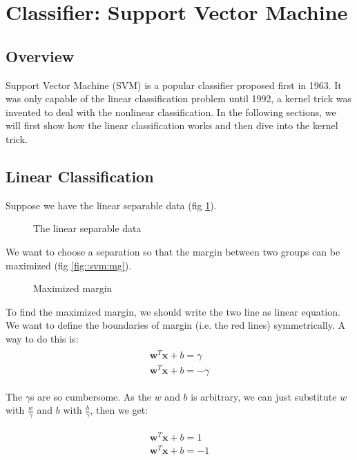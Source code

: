 \section{Classifier: Support Vector Machine}
\subsection{Overview} 
Support Vector Machine (SVM) is a popular classifier proposed first in 1963. 
It was only capable of the linear classification problem until 1992, a kernel trick was invented to deal with the nonlinear classification. 
In the following sections, we will first show how the linear classification works and then dive into the kernel trick.

\subsection{Linear Classification}
Suppose we have the linear separable data (fig \ref{fig:svm:lsd}). 
\begin{figure}[H]
\centering

\caption{The linear separable data}
\label{fig:svm:lsd}
\end{figure}

We want to choose a separation so that the margin between two groups can be maximized (fig \ref{fig::svm:mg}). 

\begin{figure}[H]
\centering

\caption{Maximized margin}
\label{fig:svm:mg}
\end{figure}

To find the maximized margin, we should write the two line as linear equation. 
We want to define the boundaries of margin (i.e. the red lines) symmetrically. A way to do this is:
\begin{align}
\begin{split}
\mathbf{w}^T \mathbf{x} + b = \gamma \\
\mathbf{w}^T \mathbf{x} + b = -\gamma
\end{split}
\end{align}

The $\gamma$s are so cumbersome. 
As the $w$ and $b$ is arbitrary, we can just substitute $w$ with $\frac{w}{\gamma}$ and $b$ with $\frac{b}{\gamma}$, 
then we get:

\begin{align}
\begin{split}
\mathbf{w}^T \mathbf{x} + b = 1 \\
\mathbf{w}^T \mathbf{x} + b = -1
\end{split}
\end{align}

